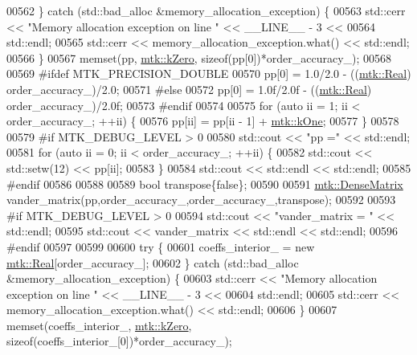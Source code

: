 \begin{DoxyCode}
{{00562   \} \textcolor{keywordflow}{catch} (std::bad\_alloc &memory\_allocation\_exception) \{
00563     std::cerr << \textcolor{stringliteral}{"Memory allocation exception on line "} << \_\_LINE\_\_ - 3 <<
00564       std::endl;
00565     std::cerr << memory\_allocation\_exception.what() << std::endl;
00566   \}
00567   memset(pp, \hyperlink{group__c01-roots_ga59a451a5fae30d59649bcda274fea271}{mtk::kZero}, \textcolor{keyword}{sizeof}(pp[0])*order\_accuracy\_);
00568 
00569 \textcolor{preprocessor}{  #ifdef MTK\_PRECISION\_DOUBLE}
00570   pp[0] = 1.0/2.0 - ((\hyperlink{group__c01-roots_gac080bbbf5cbb5502c9f00405f894857d}{mtk::Real}) order\_accuracy\_)/2.0;
00571 \textcolor{preprocessor}{  #else}
00572   pp[0] = 1.0f/2.0f - ((\hyperlink{group__c01-roots_gac080bbbf5cbb5502c9f00405f894857d}{mtk::Real}) order\_accuracy\_)/2.0f;
00573 \textcolor{preprocessor}{  #endif}
00574 
00575   \textcolor{keywordflow}{for} (\textcolor{keyword}{auto} ii = 1; ii < order\_accuracy\_; ++ii) \{
00576     pp[ii] = pp[ii - 1] + \hyperlink{group__c01-roots_ga26407c24d43b6b95480943340d285c71}{mtk::kOne};
00577   \}
00578 
00579 \textcolor{preprocessor}{  #if MTK\_DEBUG\_LEVEL > 0}
00580   std::cout << \textcolor{stringliteral}{"pp ="} << std::endl;
00581   \textcolor{keywordflow}{for} (\textcolor{keyword}{auto} ii = 0; ii < order\_accuracy\_; ++ii) \{
00582     std::cout << std::setw(12) << pp[ii];
00583   \}
00584   std::cout << std::endl << std::endl;
00585 \textcolor{preprocessor}{  #endif}
00586 
00588 
00589   \textcolor{keywordtype}{bool} transpose\{\textcolor{keyword}{false}\};
00590 
00591   \hyperlink{classmtk_1_1DenseMatrix}{mtk::DenseMatrix} vander\_matrix(pp,order\_accuracy\_,order\_accuracy\_,transpose);
00592 
00593 \textcolor{preprocessor}{  #if MTK\_DEBUG\_LEVEL > 0}
00594   std::cout << \textcolor{stringliteral}{"vander\_matrix = "} << std::endl;
00595   std::cout << vander\_matrix << std::endl << std::endl;
00596 \textcolor{preprocessor}{  #endif}
00597 
00599 
00600   \textcolor{keywordflow}{try} \{
00601     coeffs\_interior\_ = \textcolor{keyword}{new} \hyperlink{group__c01-roots_gac080bbbf5cbb5502c9f00405f894857d}{mtk::Real}[order\_accuracy\_];
00602   \} \textcolor{keywordflow}{catch} (std::bad\_alloc &memory\_allocation\_exception) \{
00603     std::cerr << \textcolor{stringliteral}{"Memory allocation exception on line "} << \_\_LINE\_\_ - 3 <<
00604       std::endl;
00605     std::cerr << memory\_allocation\_exception.what() << std::endl;
00606   \}
00607   memset(coeffs\_interior\_, \hyperlink{group__c01-roots_ga59a451a5fae30d59649bcda274fea271}{mtk::kZero}, \textcolor{keyword}{sizeof}(coeffs\_interior\_[0])*order\_accuracy\_);
}}
\end{DoxyCode}
